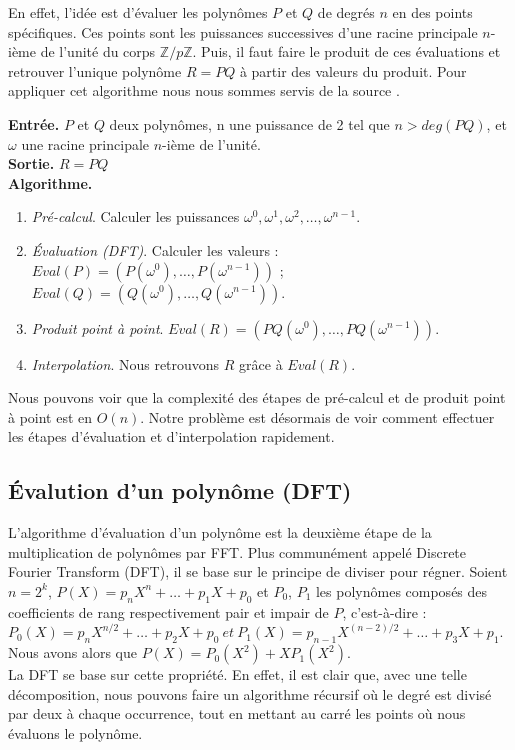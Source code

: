 \documentclass[12pt, a4paper]{article}
\begin{document}
En effet, l’idée est d’évaluer les polynômes $P$ et $Q$ de degrés $n$ en des points spécifiques. Ces points sont les puissances successives d'une racine principale $n$-ième de l'unité du corps $\mathbb{Z}/p\mathbb{Z}$. Puis, il faut faire le produit de ces évaluations et retrouver l’unique polynôme $R=PQ$ à partir des valeurs du produit. Pour appliquer cet algorithme nous nous sommes servis de la source \cite{AECF}. \\
 
\begin{tcolorbox}[colback=cyan!5!white,
                  colframe=cyan!100!black,
                  title=\textbf{Algorithme de multiplication par FFT}
                 ]
\textbf{Entrée.} $P$ et $Q$ deux polynômes, n une puissance de 2 tel que $n>deg(PQ)$, et $\omega$ une racine principale $n$-ième de l’unité. \\
\textbf{Sortie.} $R = PQ$ \\
\textbf{Algorithme.}
\begin{enumerate}[itemsep=-2ex]
\item\textit{Pré-calcul}. Calculer les puissances $\omega^0,\omega^1,\omega^2,\dots,\omega^{n-1}$. \\
\item\textit{Évaluation (DFT)}. Calculer les valeurs : \\ $Eval(P)=(P(\omega^0),\dots,P(\omega^{n-1}))$ ; $Eval(Q)=(Q(\omega^0),\dots,Q(\omega^{n-1}))$. \\
\item\textit{Produit point à point}. $Eval(R) = (PQ(\omega^0),\dots,PQ(\omega^{n-1}))$. \\
\item\textit{Interpolation}. Nous retrouvons $R$ grâce à $Eval(R)$.
\end{enumerate}
\end{tcolorbox}
Nous pouvons voir que la complexité des étapes de pré-calcul et de produit point à point est en $O(n)$. Notre problème est désormais de voir comment effectuer les étapes d'évaluation et d'interpolation rapidement.

\subsection{Évalution d'un polynôme (DFT)}

L'algorithme d'évaluation d'un polynôme est la deuxième étape de la multiplication de polynômes par FFT. Plus communément appelé Discrete Fourier Transform (DFT), il se base sur le principe de diviser pour régner.
Soient $n = 2^k$, $P(X) = p_n X^n +\dots+p_1 X + p_0$ et $P_0$, $P_1$ les polynômes composés des coefficients de rang respectivement pair et impair de $P$, c'est-à-dire : \\
$P_0(X) = p_{n} X^{n/2} +\dots+ p_2 X + p_0\ et\ P_1(X) = p_{n-1} X^{(n-2)/2} +\dots+ p_3 X + p_1$. \\
Nous avons alors que $P(X) = P_0(X^2)+X P_1(X^2)$. \\
La DFT se base sur cette propriété. En effet, il est clair que, avec une telle décomposition, nous pouvons faire un algorithme récursif où le degré est divisé par deux à chaque occurrence, tout en mettant au carré les points où nous évaluons le polynôme.
\end{document}
